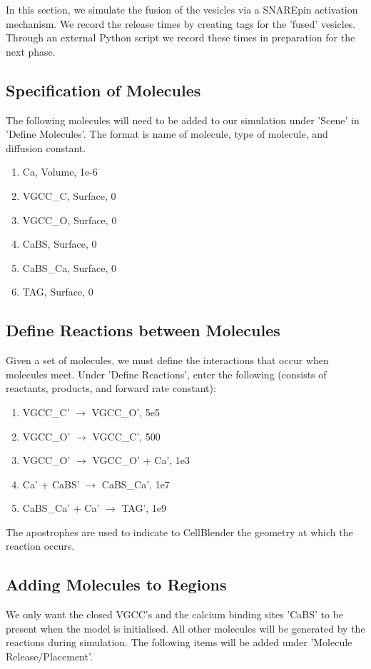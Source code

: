 \documentclass[twoside,a4paper]{refart}
\begin{document}
In this section, we simulate the fusion of the vesicles via a SNAREpin activation mechanism. We record the release times by creating tags for the 'fused' vesicles. Through an external Python script we record these times in preparation for the next phase.


\subsection{Specification of Molecules}
The following molecules will need to be added to our simulation under 'Scene' in 'Define Molecules'. The format is name of molecule, type of molecule, and diffusion constant.

\begin{enumerate}
    \item Ca, Volume, 1e-6
    \item VGCC\_C, Surface, 0
    \item VGCC\_O, Surface, 0
    \item CaBS, Surface, 0
    \item CaBS\_Ca, Surface, 0
    \item TAG, Surface, 0
\end{enumerate}

\subsection{Define Reactions between Molecules}
Given a set of molecules, we must define the interactions that occur when molecules meet. Under 'Define Reactions', enter the following (consists of reactants, products, and forward rate constant):

\begin{enumerate}
    \item VGCC\_C' $\to$ VGCC\_O', 5e5
    \item VGCC\_O' $\to$ VGCC\_C', 500
    \item VGCC\_O' $\to$ VGCC\_O' + Ca', 1e3
    \item Ca' + CaBS' $\to$ CaBS\_Ca', 1e7
    \item CaBS\_Ca' + Ca' $\to$ TAG', 1e9
\end{enumerate}

The apostrophes are used to indicate to CellBlender the geometry at which the reaction occurs.


\subsection{Adding Molecules to Regions}
We only want the closed VGCC's and the calcium binding sites 'CaBS' to be present when the model is initialised. All other molecules will be generated by the reactions during simulation. The following items will be added under 'Molecule Release/Placement'. 
\end{document}
